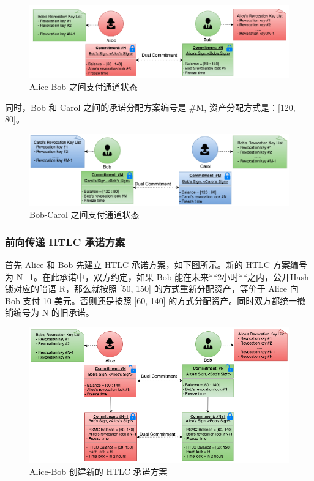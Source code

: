 \begin{appendices}
\begin{figure}[h!]
    \centering
    \includegraphics[width=12cm, keepaspectratio]{../images/alice_bob_1.png}
    \caption{Alice-Bob 之间支付通道状态}
    \label{fig:alice_bob_1}
\end{figure}

同时，Bob 和 Carol 之间的承诺分配方案编号是 \#M, 资产分配方式是：[120, 80]。

\begin{figure}[h!]
    \centering
    \includegraphics[width=12cm, keepaspectratio]{../images/bob_carol_1.png}
    \caption{Bob-Carol 之间支付通道状态}
    \label{fig:bob_carol_1}
\end{figure}

\subsubsection{前向传递 HTLC 承诺方案}
首先 Alice 和 Bob 先建立 HTLC 承诺方案，如下图所示。新的 HTLC 方案编号为 N+1。在此承诺中，双方约定，如果 Bob 能在未来**2小时**之内，公开Hash 锁对应的暗语 R，那么就按照 [50, 150] 的方式重新分配资产，等价于 Alice 向 Bob 支付 10 美元。否则还是按照 [60, 140] 的方式分配资产。同时双方都统一撤销编号为 N 的旧承诺。

\begin{figure}[h!]
    \centering
    \includegraphics[width=12cm, keepaspectratio]{../images/alice_bob_2.png}
    \caption{Alice-Bob 创建新的 HTLC 承诺方案}
    \label{fig:alice_bob_2}
\end{figure}


\end{appendices}
